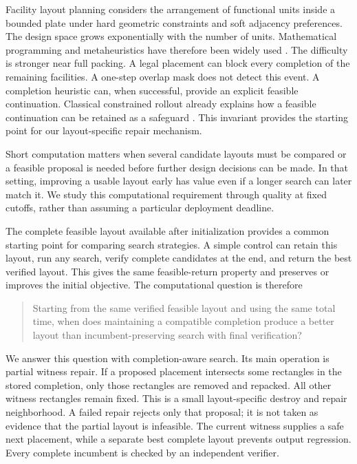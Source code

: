 \documentclass[preprint,12pt,authoryear,nonatbib]{elsarticle}
\begin{document}
Facility layout planning considers the arrangement of functional units inside a
bounded plate under hard geometric constraints and soft adjacency preferences.
The design space grows exponentially with the number of units. Mathematical
programming and metaheuristics have therefore been widely used
\citep{perez2021facility,gomes2000metaheuristic,csahin2020mathematical,Drira2007,singh2006review}.
The difficulty is stronger near full packing. A legal placement can block every
completion of the remaining facilities. A one-step overlap mask does not detect
this event. A completion heuristic can, when successful, provide an explicit
feasible continuation. Classical constrained rollout already explains how a
feasible continuation can be retained as a safeguard
\citep{Bertsekas2005Constrained,Bertsekas2020Constrained}. This invariant provides
the starting point for our layout-specific repair mechanism.

Short computation matters when several candidate layouts must be compared or
a feasible proposal is needed before further design decisions can be made.
In that setting, improving a usable layout early has value even if a longer
search can later match it. We study this computational requirement through
quality at fixed cutoffs, rather than assuming a particular deployment deadline.

The complete feasible layout available after initialization provides a common
starting point for comparing search strategies.
A simple control can retain this layout, run any search, verify complete
candidates at the end, and return the best verified layout. This gives the same
feasible-return property and preserves or improves the initial objective. The
computational question is therefore

\begin{quote}
Starting from the same verified feasible layout and using the same total time,
when does maintaining a compatible completion produce a better layout than
incumbent-preserving search with final verification?
\end{quote}

We answer this question with completion-aware search. Its main operation is
partial witness repair. If a proposed placement intersects some rectangles in
the stored completion, only those rectangles are removed and repacked. All other
witness rectangles remain fixed. This is a small layout-specific destroy and
repair neighborhood. A failed repair rejects only that proposal; it is not taken
as evidence that the partial layout is infeasible. The current witness supplies
a safe next placement, while a separate best complete layout prevents output
regression. Every complete incumbent is checked by an independent verifier.
\end{document}

